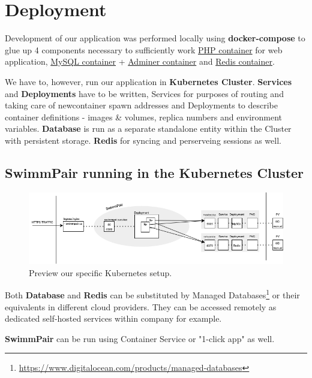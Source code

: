 \chapter{Deployment}
Development of our application was performed locally using \textbf{docker-compose} to glue up 4 components necessary to sufficiently work \underline{PHP container} for web application, \underline{MySQL container} + \underline{Adminer container} and \underline{Redis container}.
\par
We have to, however, run our application in \textbf{Kubernetes Cluster}. \textbf{Services} and \textbf{Deployments} have to be written, Services for purposes of routing and taking care of newcontainer spawn addresses and Deployments to describe container definitions - images \& volumes, replica numbers and environment variables. \textbf{Database} is run as a separate standalone entity within the Cluster with persistent storage. \textbf{Redis} for syncing and perserveing sessions as well.
\newline
\par
\section*{SwimmPair running in the Kubernetes Cluster}
\par
\begin{figure}[h]
    \centering	
    \includegraphics[scale=0.52]{img/swimmpair_deployment_k8s.png}
    \caption{Preview our specific Kubernetes setup.}
    \label{fig5.1:deplk8s}
\end{figure}
Both \textbf{Database} and \textbf{Redis} can be substituted by Managed Databases\footnote{\url{https://www.digitalocean.com/products/managed-databases}} or their equivalents in different cloud providers. They can be accessed remotely as dedicated self-hosted services within company for example.
\par \textbf{SwimmPair} can be run using Container Service or "1-click app" as well. 
